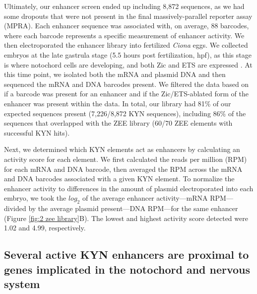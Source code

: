 Ultimately, our enhancer screen ended up including 8,872 sequences, as we had some dropouts that were not present in the final massively-parallel reporter assay (MPRA). Each enhancer sequence was associated with, on average, 88 barcodes, where each barcode represents a specific measurement of enhancer activity. We then electroporated the enhancer library into fertilized \textit{Ciona} eggs. We collected embryos at the late gastrula stage (5.5 hours post fertilization, hpf), as this stage is where notochord cells are developing, and both Zic and ETS are expressed \cite{dykes2018,matsumoto2007a,song2022}. At this time point, we isolated both the mRNA and plasmid DNA and then sequenced the mRNA and DNA barcodes present. We filtered the data based on if a barcode was present for an enhancer and if the Zic/ETS-ablated form of the enhancer was present within the data. In total, our library had 81\% of our expected sequences present (7,226/8,872 KYN sequences), including 86\% of the sequences that overlapped with the ZEE library (60/70 ZEE elements with successful KYN hits).

Next, we determined which KYN elements act as enhancers by calculating an activity score for each element. We first calculated the reads per million (RPM) for each mRNA and DNA barcode, then averaged the RPM across the mRNA and DNA barcodes associated with a given KYN element. To normalize the enhancer activity to differences in the amount of plasmid electroporated into each embryo, we took the $log_2$ of the average enhancer activity—mRNA RPM—divided by the average plasmid present—DNA RPM—for the same enhancer (Figure \ref{fig:2 zee library}B). The lowest and highest activity score detected were 1.02 and 4.99, respectively.

\subsection{Several active KYN enhancers are proximal to genes implicated in the notochord and nervous system}

